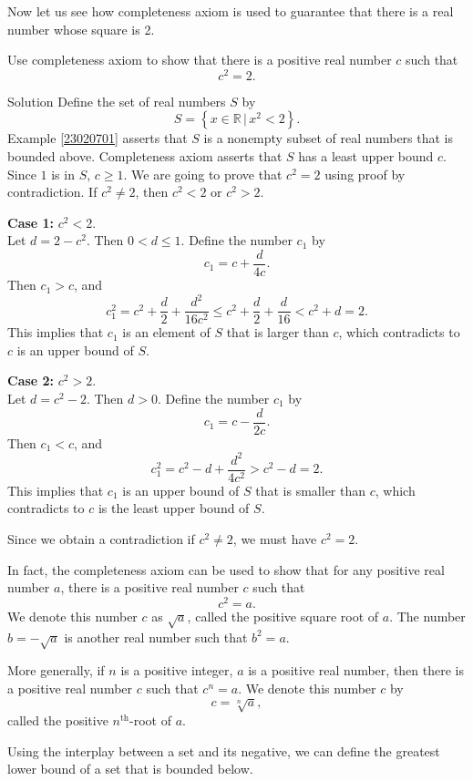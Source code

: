 Now let us see how completeness axiom is used to guarantee that there is a real number whose square is 2. 

\begin{example}[label=23021011]{}
Use completeness axiom to show that there is a positive real number $c$ such that 
\[c^2=2.\]
\end{example}

\begin{solution}{Solution}
Define the set of real numbers $S$ by
\[S=\left\{x\in \mathbb{R}\,|\, x^2<2\right\}.\] Example \ref{23020701} asserts that $S$ is a nonempty subset of real numbers that is bounded above.
Completeness axiom  asserts that $S$ has a least upper bound $c$.\bs
Since $1$ is in $S$, $c\geq 1$.
We are going to prove that $c^2=2$   using proof by contradiction. If $c^2\neq 2$, then $c^2<2$ or $c^2>2$.


\textbf{Case 1:} $c^2<2$. \\
Let $d=2-c^2$. Then $0<d\leq 1$. Define the number $c_1$ by
\[c_1= c+\frac{d}{4c}.\]
Then $c_1>c$, and
\[c_1^2=c^2+\frac{d}{2}+\frac{d^2}{16c^2}\leq c^2+\frac{d}{2}+\frac{d}{16}<c^2+d=2.\]
This implies that $c_1$ is an element of $S$ that is larger than $c$, which contradicts to $c$  is an upper bound of $S$.

\textbf{Case 2:} $c^2>2$. \\
Let $d=c^2-2$. Then $d>0$. Define the number $c_1$ by
\[c_1= c-\frac{d}{2c}.\]
Then $c_1<c$, and
\[c_1^2=c^2-d+\frac{d^2}{4c^2}>c^2-d=2.\]
This implies that $c_1$ is an upper bound of $S$ that is smaller than $c$, which contradicts to $c$ is the least upper bound of $S$.

Since we obtain a contradiction if $c^2\neq 2$, we must have $c^2=2$.
\end{solution}
In fact, the completeness axiom can be used to show that for any positive real number $a$, there is a positive  real number $c$ such that 
\[c^2=a.\] We denote this number $c$ as $\sqrt{a}$, called the positive square root of $a$. The number $b=-\sqrt{a}$ is another real number such that $b^2=a$.

More generally, if $n$ is a positive integer, $a$ is a positive real number, then there is a positive real number $c$ such that $c^n=a$. We denote this number $c$ by
\[c=\sqrt[n]{a},\]called the positive $n^{\text{th}}$-root of $a$.

Using the interplay between a set and its negative, we can define the greatest lower bound of a set that is bounded below. 
 
